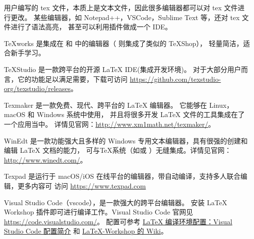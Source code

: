%
%
%
%
%



用户编写的 tex 文件，本质上是文本文件，因此很多编辑器都可以对 tex 文件进行更改。
某些编辑器，如 Notepad++，VSCode，Sublime Text 等，还对 tex 文件进行了语法高亮，
甚至可以利用插件做成一个 IDE。

TeXworks 是集成在 \TeXLive{} 和 \MiKTeX{} 中的编辑器（\MacTeX{} 则集成了类似的 
TeXShop），
轻量简洁，适合新手学习。

TeXStudio 是一款跨平台的开源 \LaTeX{} IDE(集成开发环境)。
对于大部分用户而言，它的功能足以满足需要，下载可访问 
\url{https://github.com/texstudio-org/texstudio/releases}。

Texmaker 是一款免费、现代、跨平台的 \LaTeX{} 编辑器。 它能够在 Linux，macOS 和 
Windows 系统中使用，
并且将很多开发 \LaTeX{} 文件的工具集成在了一个应用当中。
详情见官网：\url{http://www.xm1math.net/texmaker/}。

WinEdt 是一款功能强大且多样的 Windows 专用文本编辑器，具有很强的创建和编辑 \LaTeX{} 
文档的能力，
可与TeX系统（如\MiKTeX{}或 
\TeXLive{}）无缝集成。详情见官网：\url{http://www.winedt.com/}。

Texpad 是运行于 macOS/iOS 在线平台的编辑器，带自动编译，支持多人联合编辑，更多内容可
访问
\url{https://www.texpad.com}

Visual Studio Code（vscode），是一款强大的跨平台编辑器。
安装 LaTeX Workshop 插件即可进行编译工作。Visual Studio Code 官网见 
\url{https://code.visualstudio.com/}。
配置可参考 \href{https://github.com/EthanDeng/vscode-latex}{LaTeX 编译环境配置：Visual Studio Code 配置简介} 和 \href{https://github.com/James-Yu/LaTeX-Workshop/wiki}{LaTeX-Workshop 的 Wiki}。


